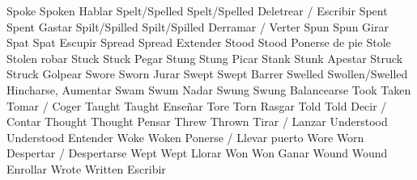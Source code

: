 	            {Spoke}{}	            {Spoken}{}              {Hablar}{}
	            {Spelt/Spelled}{}	    {Spelt/Spelled}{}       {Deletrear / Escribir}{}
	            {Spent}{}	            {Spent}{}               {Gastar}{}
	            {Spilt/Spilled}{}	    {Spilt/Spilled}{}       {Derramar / Verter}{}
	            {Spun}{}	            {Spun}{}                {Girar}{}
	            {Spat}{}	            {Spat}{}                {Escupir}{}
	            {Spread}{}	            {Spread}{}              {Extender}{}
	            {Stood}{}	            {Stood}{}               {Ponerse de pie}{}
	            {Stole}{}	            {Stolen}{}              {robar}{}
	            {Stuck}{}	            {Stuck}{}               {Pegar}{}
	            {Stung}{}	            {Stung}{}               {Picar}{}
	            {Stank}{}	            {Stunk}{}               {Apestar}{}
	            {Struck}{}	            {Struck}{}              {Golpear}{}
	            {Swore}{}	            {Sworn}{}               {Jurar}{}
	            {Swept}{}	            {Swept}{}               {Barrer}{}
	            {Swelled}{}	            {Swollen/Swelled}{}     {Hincharse, Aumentar}{}
	            {Swam}{}	            {Swum}{}                {Nadar}{}
	            {Swung}{}	            {Swung}{}               {Balancearse}{}
	            {Took}{}	            {Taken}{}               {Tomar / Coger}{}
	            {Taught}{}	            {Taught}{}              {Enseñar}{}
	            {Tore}{}	            {Torn}{}                {Rasgar}{}
	            {Told}{}	            {Told}{}                {Decir / Contar}{}
	            {Thought}{}	            {Thought}{}             {Pensar}{}
	            {Threw}{}	            {Thrown}{}              {Tirar / Lanzar}{}
	        {Understood}{}	        {Understood}{}          {Entender}{}
	            {Woke}{}	            {Woken}{}               {Ponerse / Llevar puerto}{}
	            {Wore}{}	            {Worn}{}                {Despertar / Despertarse}{}
	            {Wept}{}	            {Wept}{}                {Llorar}{}
	            {Won}{}	                {Won}{}                 {Ganar}{}
	            {Wound}{}	            {Wound}{}               {Enrollar}{}
	            {Wrote}{}	            {Written}{}             {Escribir}{}